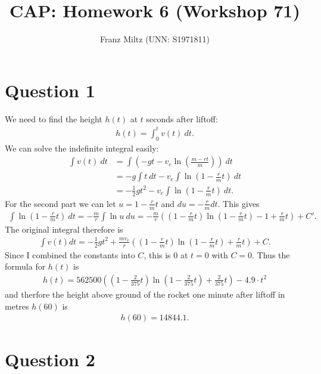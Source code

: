 \documentclass{article}
\title{CAP: Homework 6 (Workshop 71)}
\author{Franz Miltz (UNN: S1971811)}
\begin{document}
\maketitle
\section*{Question 1}
We need to find the height $h(t)$ at $t$ seconds after liftoff:
\begin{align*}
  h(t) = \int_0^t v(t)\: dt.
\end{align*}
We can solve the indefinite integral easily:
\begin{align*}
  \int v(t)\:dt & = \int \left(-gt -v_e \ln \left(\frac{m-rt}{m}\right)\right)\:dt \\
                & = -g \int t\: dt -v_e \int \ln\left(1-\frac{r}{m}t\right)\: dt   \\
                & =-\frac{1}{2}gt^2-v_e \int \ln\left(1-\frac{r}{m}t\right)\:dt.
\end{align*}
For the second part we can let $u=1-\frac{r}{m}t$  and  $du = -\frac{r}{m}dt$. This gives
\begin{align*}
  \int\ln\left(1-\frac{r}{m}t\right)\: dt = -\frac{m}{r}\int \ln u\: du = -\frac{m}{r}\left(\left(1-\frac{r}{m}t\right)\ln\left(1-\frac{r}{m}t\right)-1+\frac{r}{m}t\right)+C'.
\end{align*}
The original integral therefore is
\begin{align*}
  \int v(t)dt =-\frac{1}{2}gt^2+\frac{mv_e}{r}\left(\left(1-\frac{r}{m}t\right)\ln\left(1-\frac{r}{m}t\right)+\frac{r}{m}t\right)+C.
\end{align*}
Since I combined the constants into $C$, this is $0$ at $t=0$ with $C=0$. Thus the formula for $h(t)$ is
\begin{align*}
  h(t)=562500\left(\left(1-\frac{2}{375}t\right)\ln\left(1-\frac{2}{375}t\right)+\frac{2}{375}t\right) -4.9\cdot t^2
\end{align*}
and therfore the height above ground of the rocket one minute after liftoff in metres $h(60)$ is
\begin{align*}
  h(60)=14844.1.
\end{align*}
\section*{Question 2}
\end{document}
